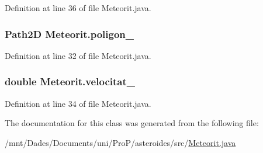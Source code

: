 Definition at line 36 of file Meteorit.\+java.

\hypertarget{class_meteorit_ac3feb84c72de283df0167b858f9eceef}{}
\subsubsection[{poligon\+\_\+}]{\setlength{\rightskip}{0pt plus 5cm}Path2\+D Meteorit.\+poligon\+\_\+\hspace{0.3cm}{\ttfamily [private]}}\label{class_meteorit_ac3feb84c72de283df0167b858f9eceef}


Definition at line 32 of file Meteorit.\+java.

\hypertarget{class_meteorit_a216cca6026aa22f55aa162311b1e6530}{}
\subsubsection[{velocitat\+\_\+}]{\setlength{\rightskip}{0pt plus 5cm}double Meteorit.\+velocitat\+\_\+\hspace{0.3cm}{\ttfamily [private]}}\label{class_meteorit_a216cca6026aa22f55aa162311b1e6530}


Definition at line 34 of file Meteorit.\+java.



The documentation for this class was generated from the following file\+:\begin{DoxyCompactItemize}
\item 
/mnt/\+Dades/\+Documents/uni/\+Pro\+P/asteroides/src/\hyperlink{_meteorit_8java}{Meteorit.\+java}\end{DoxyCompactItemize}
